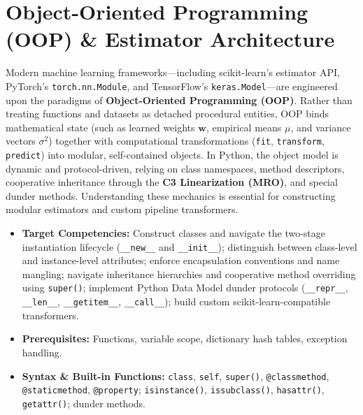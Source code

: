 \chapter{Object-Oriented Programming (OOP) \& Estimator Architecture}

Modern machine learning frameworks---including scikit-learn's estimator API, PyTorch's \texttt{torch.nn.Module}, and TensorFlow's \texttt{keras.Model}---are engineered upon the paradigms of \textbf{Object-Oriented Programming (OOP)}. Rather than treating functions and datasets as detached procedural entities, OOP binds mathematical state (such as learned weights $\mathbf{w}$, empirical means $\mu$, and variance vectors $\sigma^2$) together with computational transformations (\texttt{fit}, \texttt{transform}, \texttt{predict}) into modular, self-contained objects. In Python, the object model is dynamic and protocol-driven, relying on class namespaces, method descriptors, cooperative inheritance through the \textbf{C3 Linearization (MRO)}, and special dunder methods. Understanding these mechanics is essential for constructing modular estimators and custom pipeline transformers.

\vspace{0.5cm}
\begin{tcolorbox}[colback=primarylight, colframe=primarydark, title={\textbf{Executive Roadmap \& Learning Objectives}}]
\begin{itemize}
    \item \textbf{Target Competencies:} Construct classes and navigate the two-stage instantiation lifecycle (\texttt{\_\_new\_\_} and \texttt{\_\_init\_\_}); distinguish between class-level and instance-level attributes; enforce encapsulation conventions and name mangling; navigate inheritance hierarchies and cooperative method overriding using \texttt{super()}; implement Python Data Model dunder protocols (\texttt{\_\_repr\_\_}, \texttt{\_\_len\_\_}, \texttt{\_\_getitem\_\_}, \texttt{\_\_call\_\_}); build custom scikit-learn-compatible transformers.
    \item \textbf{Prerequisites:} Functions, variable scope, dictionary hash tables, exception handling.
    \item \textbf{Syntax \& Built-in Functions:} \texttt{class}, \texttt{self}, \texttt{super()}, \texttt{@classmethod}, \texttt{@staticmethod}, \texttt{@property}; \texttt{isinstance()}, \texttt{issubclass()}, \texttt{hasattr()}, \texttt{getattr()}; dunder methods.
\end{itemize}
\end{tcolorbox}

